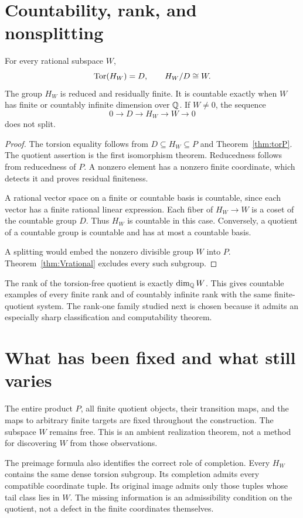 \section{Countability, rank, and nonsplitting}
\begin{proposition}
\label{thm:HWstructure}
For every rational subspace $W$,
\[
\operatorname{Tor}(H_W)=D,\qquad H_W/D\cong W.
\]
The group $H_W$ is reduced and residually finite. It is countable exactly when $W$ has finite or countably infinite dimension over $\mathbb Q$. If $W\ne0$, the sequence
\[
0\longrightarrow D\longrightarrow H_W\longrightarrow W\longrightarrow0
\]
does not split.
\end{proposition}
\begin{proof}
The torsion equality follows from $D\subseteq H_W\subseteq P$ and Theorem~\ref{thm:torP}. The quotient assertion is the first isomorphism theorem. Reducedness follows from reducedness of $P$. A nonzero element has a nonzero finite coordinate, which detects it and proves residual finiteness.

A rational vector space on a finite or countable basis is countable, since each vector has a finite rational linear expression. Each fiber of $H_W\to W$ is a coset of the countable group $D$. Thus $H_W$ is countable in this case. Conversely, a quotient of a countable group is countable and has at most a countable basis.

A splitting would embed the nonzero divisible group $W$ into $P$. Theorem~\ref{thm:Vrational} excludes every such subgroup.
\end{proof}
The rank of the torsion-free quotient is exactly $\dim_{\mathbb Q}W$. This gives countable examples of every finite rank and of countably infinite rank with the same finite-quotient system. The rank-one family studied next is chosen because it admits an especially sharp classification and computability theorem.

\section{What has been fixed and what still varies}
The entire product $P$, all finite quotient objects, their transition maps, and the maps to arbitrary finite targets are fixed throughout the construction. The subspace $W$ remains free. This is an ambient realization theorem, not a method for discovering $W$ from those observations.

The preimage formula also identifies the correct role of completion. Every $H_W$ contains the same dense torsion subgroup. Its completion admits every compatible coordinate tuple. Its original image admits only those tuples whose tail class lies in $W$. The missing information is an admissibility condition on the quotient, not a defect in the finite coordinates themselves.
